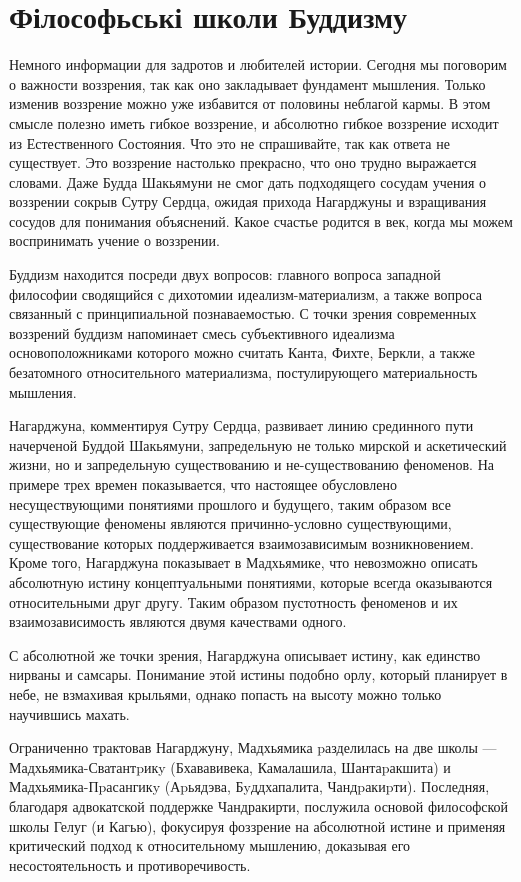 \section{Філософьські школи Буддизму}

Немного информации для задротов и любителей истории. Сегодня мы поговорим о важности воззрения, так как  оно закладывает фундамент мышления. Только изменив воззрение можно уже избавится от половины неблагой кармы. В этом смысле полезно иметь гибкое воззрение, и абсолютно гибкое воззрение исходит из Естественного Состояния. Что это не спрашивайте, так как ответа не существует. Это воззрение настолько прекрасно, что оно трудно выражается словами. Даже Будда Шакьямуни не смог дать подходящего сосудам учения о воззрении сокрыв Сутру Сердца, ожидая прихода Нагарджуны и взращивания сосудов для понимания объяснений. Какое счастье родится в век, когда мы можем воспринимать учение о воззрении. 

Буддизм находится посреди двух вопросов: главного вопроса западной философии сводящийся с дихотомии идеализм-материализм, а также вопроса связанный с принципиальной познаваемостью. С точки зрения современных воззрений буддизм напоминает смесь субъективного идеализма основоположниками которого можно считать Канта, Фихте, Беркли, а также безатомного относительного материализма, постулирующего материальность мышления.

Нагарджуна, комментируя Сутру Сердца, развивает линию срединного пути начерченой Буддой Шакьямуни, запредельную не только мирской и аскетический жизни, но и запредельную существованию и не-существованию феноменов. На примере трех времен показывается, что настоящее обусловлено несуществующими понятиями прошлого и будущего, таким образом все существующие феномены являются причинно-условно существующими, существование которых поддерживается взаимозависимым возникновением. Кроме того, Нагарджуна показывает в Мадхьямике, что невозможно описать абсолютную истину концептуальными понятиями, которые всегда оказываются относительными друг другу. Таким образом пустотность феноменов и их взаимозависимость являются двумя качествами одного.

С абсолютной же точки зрения, Нагарджуна описывает истину, как единство нирваны и самсары. Понимание этой истины подобно орлу, который планирует в небе, не взмахивая крыльями, однако попасть на высоту можно только научившись махать.

Ограниченно трактовав Нагарджуну, Мадхьямика pазделилась на две школы — Мадхьямика-Сватантpикy (Бхававивека, Камалашила, Шантаpакшита) и Мадхьямика-Пpасангикy (Аpьядэва, Бyддхапалита, Чандpакиpти). Последняя, благодаря адвокатской поддержке Чандракирти, послужила основой философской школы Гелуг (и Кагью), фокусируя фоззрение на абсолютной истине и применяя критический подход к относительному мышлению, доказывая его несостоятельность и противоречивость.

